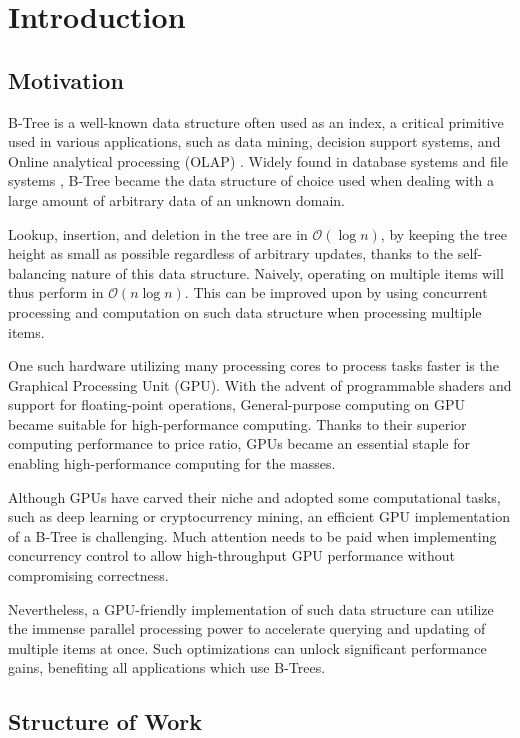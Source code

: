 \chapter{Introduction}\label{chapter:introduction}

\section{Motivation}

B-Tree is a well-known data structure often used as an index, a critical primitive used in various applications, such as data mining, decision support systems, and Online analytical processing (OLAP) \cite{olap,goetz-tech}. Widely found in database systems and file systems \cite{postgresql,btrfs}, B-Tree became the data structure of choice used when dealing with a large amount of arbitrary data of an unknown domain.

Lookup, insertion, and deletion in the tree are in $\mathcal{O}(\log{n})$, by keeping the tree height as small as possible regardless of arbitrary updates, thanks to the self-balancing nature of this data structure. Naively, operating on multiple items will thus perform in $\mathcal{O}(n \log{n})$. This can be improved upon by using concurrent processing and computation on such data structure when processing multiple items.

One such hardware utilizing many processing cores to process tasks faster is the Graphical Processing Unit (GPU). With the advent of programmable shaders and support for floating-point operations, General-purpose computing on GPU became suitable for high-performance computing. Thanks to their superior computing performance to price ratio, GPUs became an essential staple for enabling high-performance computing for the masses.

Although GPUs have carved their niche and adopted some computational tasks, such as deep learning or cryptocurrency mining, an efficient GPU implementation of a B-Tree is challenging. Much attention needs to be paid when implementing concurrency control to allow high-throughput GPU performance without compromising correctness.

Nevertheless, a GPU-friendly implementation of such data structure can utilize the immense parallel processing power to accelerate querying and updating of multiple items at once. Such optimizations can unlock significant performance gains, benefiting all applications which use B-Trees.

\section{Structure of Work}

